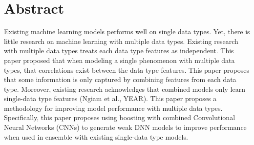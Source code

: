 
\section{Abstract}

Existing machine learning models performs well on single data types.
Yet, there is little research on machine learning with multiple data types.
Existing research with multiple data types treats each data type features as independent.
This paper proposed that when modeling a single phenomenon with multiple data types, that correlations exist between the data type features. This paper proposes that some information is only captured by combining features from each data type.
Moreover, existing research acknowledges that combined models only learn single-data type features (Ngiam et al., YEAR).
This paper proposes a methodology for improving model performance with multiple data types.  Specifically, this paper proposes using boosting with combined Convolutional Neural Networks (CNNs) to generate weak DNN models to improve performance when used in ensemble with existing single-data type models.












